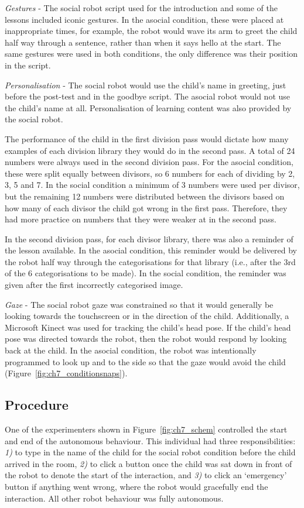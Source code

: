 \textit{Gestures} - The social robot script used for the introduction and some of the lessons included iconic gestures. In the asocial condition, these were placed at inappropriate times, for example, the robot would wave its arm to greet the child half way through a sentence, rather than when it says hello at the start. The same gestures were used in both conditions, the only difference was their position in the script.

\textit{Personalisation} - The social robot would use the child's name in greeting, just before the post-test and in the goodbye script. The asocial robot would not use the child's name at all. Personalisation of \gls{learning} content was also provided by the social robot. 

The performance of the child in the first division pass would dictate how many examples of each division library they would do in the second pass. A total of 24 numbers were always used in the second division pass. For the asocial condition, these were split equally between divisors, so 6 numbers for each of dividing by 2, 3, 5 and 7. In the social condition a minimum of 3 numbers were used per divisor, but the remaining 12 numbers were distributed between the divisors based on how many of each divisor the child got wrong in the first pass. Therefore, they had more practice on numbers that they were weaker at in the second pass.

In the second division pass, for each divisor library, there was also a reminder of the lesson available. In the asocial condition, this reminder would be delivered by the robot half way through the categorisations for that library (i.e., after the 3rd of the 6 categorisations to be made). In the social condition, the reminder was given after the first incorrectly categorised image.

\textit{Gaze} - The social robot gaze was constrained so that it would generally be looking towards the touchscreen or in the direction of the child. Additionally, a Microsoft Kinect was used for tracking the child's head pose. If the child's head pose was directed towards the robot, then the robot would respond by looking back at the child. In the asocial condition, the robot was intentionally programmed to look up and to the side so that the gaze would avoid the child (Figure~\ref{fig:ch7_conditionsnaps}).

\subsection{Procedure}\label{sec:socasoc-wizard}
One of the experimenters shown in Figure~\ref{fig:ch7_schem} controlled the start and end of the autonomous behaviour. This individual had three responsibilities: \textit{1)} to type in the name of the child for the social robot condition before the child arrived in the room, \textit{2)} to click a button once the child was sat down in front of the robot to denote the start of the interaction, and \textit{3)} to click an `emergency' button if anything went wrong, where the robot would gracefully end the interaction. All other robot behaviour was fully autonomous.


